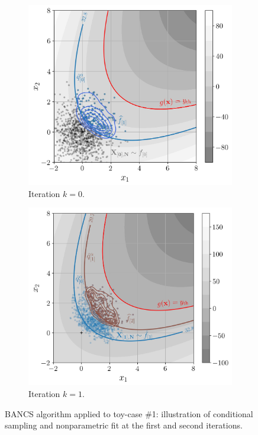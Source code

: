 \begin{figure}[!ht]
    \centering
    \begin{subfigure}[b]{0.49\linewidth}
        \centering
        \includegraphics[width=\linewidth]{part3/figures/BANCS/bancs_illustration0.jpg}
        \caption{Iteration $k=0$.}
    \end{subfigure}
    \begin{subfigure}[b]{0.49\linewidth}
        \centering
        \includegraphics[width=\linewidth]{part3/figures/BANCS/bancs_illustration1.jpg}
        \caption{Iteration $k=1$.}
    \end{subfigure}
    \caption{BANCS algorithm applied to toy-case \#1: illustration of conditional sampling and nonparametric fit at the first and second iterations.}
    \label{fig:bancs_illustration}
\end{figure}

